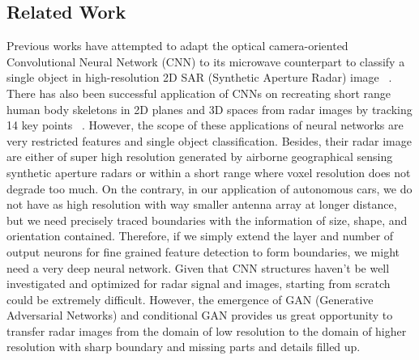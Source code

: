 \subsection{Related Work}
Previous works have attempted to adapt the optical camera-oriented Convolutional Neural Network (CNN) to its microwave counterpart to classify a single object in high-resolution 2D SAR (Synthetic Aperture Radar) image ~\cite{SAR_DL, ship_SAR, change_SAR}. There has also been successful application of CNNs on recreating  short range human body skeletons in 2D planes and 3D spaces from radar images by tracking 14 key points ~\cite{rfpose, rfpose3D}. However, the scope of these applications of neural networks are very restricted features and single object classification. Besides, their radar image are either of super high resolution generated by airborne geographical sensing synthetic aperture radars or within a short range where voxel resolution does not degrade too much. On the contrary, in our application of autonomous cars, we do not have as high resolution with way smaller antenna array at longer distance, but we need precisely traced boundaries with the information of size, shape, and orientation contained. Therefore, if we simply extend the layer and number of output neurons for fine grained feature detection to form boundaries, we might need a very deep neural network. Given that CNN structures haven't be well investigated and optimized for radar signal and images, starting from scratch could be extremely difficult. However, the emergence of GAN (Generative Adversarial Networks) and conditional GAN provides us great opportunity to transfer radar images from the domain of low resolution to the domain of higher resolution with sharp boundary and missing parts and details filled up. 

